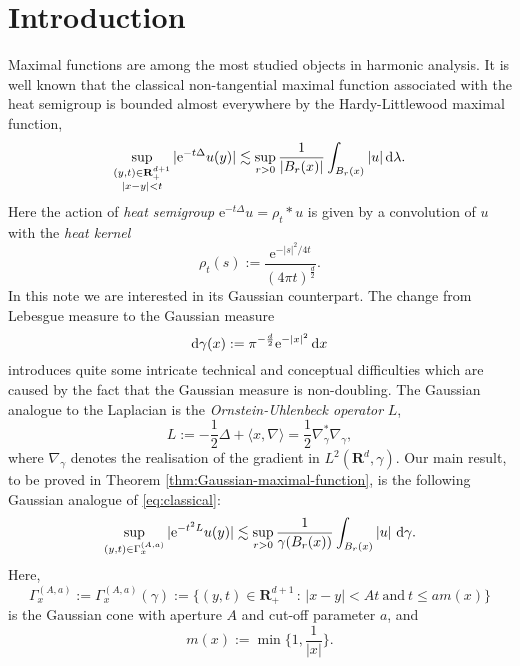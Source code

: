 \documentclass{amsart}
\theoremstyle{remark}
\newcommand{\D}{\,\textup{d}}
\newcommand{\la}{\langle}
\newcommand{\ra}{\rangle}
\renewcommand{\leq}{\leqslant}
\renewcommand{\leq}{\leqslant}
\newcommand{\R}{\mathbf R}
\newcommand{\e}{\mathrm{e}} %
\renewcommand{\leq}{\leqslant}%
\begin{document}
\section{Introduction}
Maximal functions are among the most studied objects in harmonic
analysis. 
It is well known that the classical non-tangential maximal
function associated with the heat semigroup is bounded almost everywhere
by the Hardy-Littlewood maximal function, 
\begin{equation}\label{eq:classical}
  \sup_{\substack{(y, t) \in   \R^{d + 1}_+\\ |x - y| < t}} |\e^{-t \Delta} u(y)| \lesssim \sup_{r
    > 0}  \frac1{|B_r(x)|}\int_{B_r(x)} |u| \D\lambda.
\end{equation}
Here the action of \emph{heat semigroup} $\e^{-t \Delta} u = \rho_t \ast u$ is
given by a convolution of $u$ with the \emph{heat kernel}
\begin{equation*}
  \rho_t(s) := \frac{\e^{-|s|^2/4t}}{(4\pi t)^{\frac{d}2}}.
\end{equation*}
In this note we are interested in its Gaussian counterpart. The change from Lebesgue measure to the Gaussian measure
\begin{equation}
  \label{eq:Gaussian-measure}
  \mathrm{d}\gamma(x) := \pi^{-\frac{d}2} \e^{-|x|^2} \D{x}
\end{equation}
introduces quite some intricate technical and conceptual difficulties which are
caused by the fact that the Gaussian measure is non-doubling. 
The Gaussian analogue to the Laplacian is the
\emph{Ornstein-Uhlenbeck operator} $L$,
\begin{equation}
  \label{eq:Ornstein-Uhlenbeck-operator}
  L := -\frac12 \Delta + \la x, \nabla \ra = \frac12 \nabla_\gamma^* \nabla_\gamma,
\end{equation}
where $\nabla_\gamma$ denotes the realisation of the gradient in $L^2(\R^d,\gamma)$.
Our main result, to be proved in Theorem \ref{thm:Gaussian-maximal-function},
is the following Gaussian analogue of \eqref{eq:classical}:
\begin{equation}
  \label{eq:main}
  \sup_{(y, t) \in \Gamma_x^{(A, a)}} |\e^{-t^2 L} u(y)| \lesssim \sup_{r > 0}
  \frac1{\gamma(B_r(x))}\int_{B_r(x)} |u| \, \D\gamma.
\end{equation}
Here, 
\begin{equation}
  \label{eq:Gaussian-cone}
  \Gamma_x^{(A, a)} := \Gamma_x^{(A, a)}(\gamma) := \{(y, t) \in \R^{d + 1}_+ \,: \, |x - y| < At \:\text{and}\: t \leq a m(x)\}
\end{equation}
is the Gaussian cone with aperture $A$ and cut-off parameter $a$, and 
\begin{equation}\label{eq:m-function}
  m(x) := \min\biggl\{1, \frac1{|x|} \biggr\}. %
\end{equation}
\end{document}
